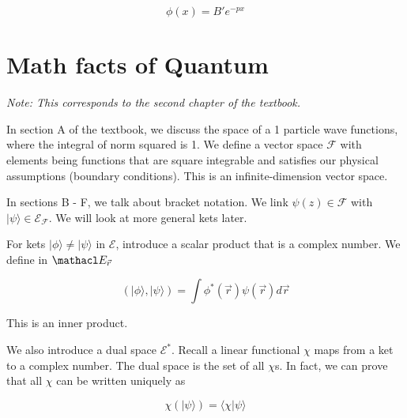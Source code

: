 \documentclass[12pt]{article}
\begin{document}
\begin{equation}
    \phi(x) = B'e^{-px}
\end{equation}

\section{Math facts of Quantum}

\textit{Note: This corresponds to the second chapter of the textbook.}

In section A of the textbook, we discuss the space of a 1 particle wave functions, where the integral of norm squared is 1. We define a vector space $\mathcal F$ with elements being functions that are square integrable and satisfies our physical assumptions (boundary conditions). This is an infinite-dimension vector space.

In sections B - F, we talk about bracket notation. We link $\psi(z) \in \mathcal F$ with $|\psi\rangle \in \mathcal E_{\mathcal F}$. We will look at more general kets later.

For kets $|\phi\rangle \neq |\psi\rangle$ in $\mathcal E$, introduce a scalar product that is a complex number. We define in $\mathacl E_{\vec r}$

\begin{equation}
    \left(|\phi\rangle, |\psi\rangle\right) = \int\phi^*(\vec r)\psi(\vec r) d\vec r
\end{equation}

This is an inner product.

We also introduce a dual space $\mathcal E^*$. Recall a linear functional $\chi$ maps from a ket to a complex number. The dual space is the set of all $\chi$s. In fact, we can prove that all $\chi$ can be written uniquely as

\begin{equation}
    \chi\left(|\psi\rangle\right) = \langle \chi | \psi \rangle
\end{equation}
\end{document}
